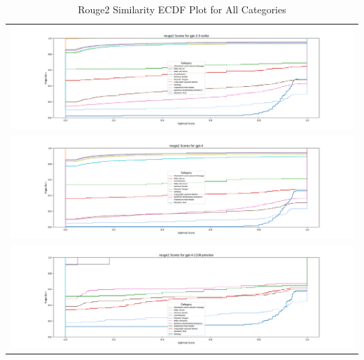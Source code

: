 \documentclass{article}
\begin{document}
\begin{table}[ht] 
\centering 
\begin{tabular}{c} 
\includegraphics[width=1.0\textwidth]{plots/rouge2-ecdf-plot-gpt-3.5-turbo.png}  \\  
\includegraphics[width=1.0\textwidth]{plots/rouge2-ecdf-plot-gpt-4.png}  \\ 
\includegraphics[width=1.0\textwidth]{plots/rouge2-ecdf-plot-gpt-4-1106-preview.png}  \\ 
\end{tabular} 
\caption{Rouge2 Similarity ECDF Plot for All Categories} 
\label{tab:images} 
\end{table}
\end{document}
